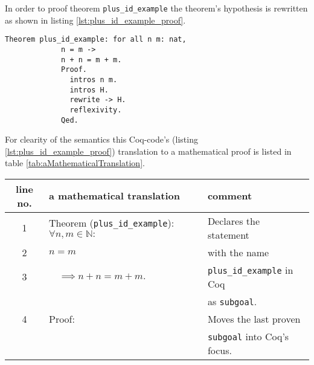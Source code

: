 	     In order to proof theorem \lstinline!plus_id_example! the theorem's hypothesis is rewritten as shown in listing \ref{lst:plus_id_example_proof}.
	     \begin{lstlisting}[caption = \lstinline!plus_id_example! and it's proof, label= {lst:plus_id_example_proof}]
           Theorem plus_id_example: for all n m: nat,
             n = m ->
             n + n = m + m.
             Proof.
               intros n m.
               intros H.
               rewrite -> H.
               reflexivity.
             Qed.
         \end{lstlisting} 
         For clearity of the semantics this Coq-code's (listing \ref{lst:plus_id_example_proof}) translation to a mathematical proof is listed in table \ref{tab:aMathematicalTranslation}.  
         \begin{table}[h]       
	   	  \begin{center}
	 	    \begin{tabular}{|c|l|l|}	       
	     	\hline
	     	 line no.  & a mathematical translation           & comment  \\  \hline
	     	  1        & Theorem (\verb!plus_id_example!): $\forall n,m \in \mathbb{N}:$ 
	     	                                                  & Declares the statement \\ 
	     	  2         & $n=m$                                & with the name   \\ 
	          3        & $\quad\implies n+n = m+m.$      & \lstinline!plus_id_example! in Coq \\  
		              &      & as \lstinline!subgoal!. \\  \hline
	     	  4        & Proof:                              & Moves the last proven \\   
	     	      	   &                                     & \lstinline!subgoal! into Coq's focus.  \\     \hline
	     	      	                      

\end{tabular}
\end{center}
\end{table}
